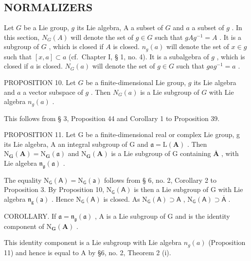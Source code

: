 \subsection{NORMALIZERS}

Let \(G\) be a Lie group, \(g\) its Lie algebra, A a subset of \(G\) and \(a\) a subset of \(g\) . In this section, \(N_G(A)\) will denote the set of \(g \in G\) such that \(gAg^{-1} = A\) . It is a subgroup of \(G\) , which is closed if \(A\) is closed. \(n_g(a)\) will denote the set of \(x \in g\) such that \([x, a] \subset a\) (cf.~Chapter I, § 1, no. 4). It is a subalgebra of \(g\) , which is closed if \(a\) is closed. \(N_G(a)\) will denote the set of \(g \in G\) such that \(gag^{-1} = a\) .

PROPOSITION 10. Let \(G\) be a finite-dimensional Lie group, \(g\) its Lie algebra and \(a\) a vector subspace of \(g\) . Then \(N_G(a)\) is a Lie subgroup of \(G\) with Lie algebra \(n_g(a)\) .

This follows from § 3, Proposition 44 and Corollary 1 to Proposition 39.

PROPOSITION 11. Let G be a finite-dimensional real or complex Lie group, g its Lie algebra, A an integral subgroup of G and \(\mathfrak{a} = \mathrm{L}(\mathbf{A})\) . Then \(\mathrm{N}_{\mathbf{G}}(\mathbf{A}) = \mathrm{N}_{\mathbf{G}}(\mathfrak{a})\) and \(\mathrm{N}_{\mathbf{G}}(\mathbf{A})\) is a Lie subgroup of G containing \(\overline{\mathbf{A}}\) , with Lie algebra \(\mathfrak{n}_{\mathfrak{g}}(\mathfrak{a})\) .

The equality \(\mathrm{N}_{\mathsf{G}}(\mathsf{A}) = \mathrm{N}_{\mathsf{G}}(\mathsf{a})\) follows from § 6, no. 2, Corollary 2 to Proposition 3. By Proposition 10, \(\mathrm{N}_{\mathsf{G}}(\mathsf{A})\) is then a Lie subgroup of G with Lie algebra \(\mathfrak{n}_{\mathsf{g}}(\mathsf{a})\) . Hence \(\mathrm{N}_{\mathsf{G}}(\mathsf{A})\) is closed. As \(\mathrm{N}_{\mathsf{G}}(\mathsf{A}) \supset \mathsf{A}\) , \(\mathrm{N}_{\mathsf{G}}(\mathsf{A}) \supset \overline{\mathsf{A}}\) .

COROLLARY. If \(\mathfrak{a} = \mathfrak{n}_{\mathfrak{g}}(\mathfrak{a})\) , A is a Lie subgroup of G and is the identity component of \(\mathrm{N}_{\mathbf{G}}(\mathbf{A})\) .

This identity component is a Lie subgroup with Lie algebra \(n_{g}(a)\) (Proposition 11) and hence is equal to A by §6, no. 2, Theorem 2 (i).
\relax{}
